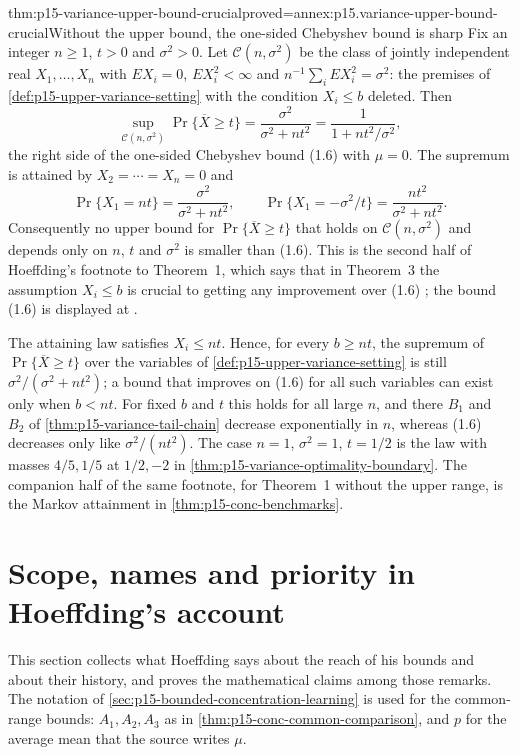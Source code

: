 \begin{hbtheorem}{thm:p15-variance-upper-bound-crucial}{proved=annex:p15.variance-upper-bound-crucial}{Without the upper bound, the one-sided Chebyshev bound is sharp}
Fix an integer \(n\geq1\), \(t>0\) and \(\sigma^2>0\). Let
\(\mathcal C(n,\sigma^2)\) be the class of jointly independent real
\(X_1,\ldots,X_n\) with \(EX_i=0\), \(EX_i^2<\infty\) and
\(n^{-1}\sum_iEX_i^2=\sigma^2\): the premises of
\cref{def:p15-upper-variance-setting} with the condition \(X_i\leq b\)
deleted. Then
\[
 \sup_{\mathcal C(n,\sigma^2)}\Pr\{\overline X\geq t\}
 =\frac{\sigma^2}{\sigma^2+nt^2}
 =\frac1{1+nt^2/\sigma^2},
\]
the right side of the one-sided Chebyshev bound (1.6) with \(\mu=0\).
The supremum is attained by \(X_2=\cdots=X_n=0\) and
\[
 \Pr\{X_1=nt\}=\frac{\sigma^2}{\sigma^2+nt^2},\qquad
 \Pr\{X_1=-\sigma^2/t\}=\frac{nt^2}{\sigma^2+nt^2}.
\]
Consequently no upper bound for \(\Pr\{\overline X\geq t\}\) that holds
on \(\mathcal C(n,\sigma^2)\) and depends only on \(n\), \(t\) and
\(\sigma^2\) is smaller than (1.6). This is the second half of
Hoeffding's footnote to Theorem~1, which says that in Theorem~3 the
assumption \(X_i\leq b\) is crucial to getting any improvement over
(1.6) \cite[p.~15 n.~4]{Hoeffding1963BoundedSums}; the bound (1.6) is
displayed at \cite[p.~13]{Hoeffding1963BoundedSums}.

The attaining law satisfies \(X_i\leq nt\). Hence, for every \(b\geq nt\),
the supremum of \(\Pr\{\overline X\geq t\}\) over the variables of
\cref{def:p15-upper-variance-setting} is still \(\sigma^2/(\sigma^2+nt^2)\);
a bound that improves on (1.6) for all such variables can exist only
when \(b<nt\). For fixed \(b\) and \(t\) this holds for all large \(n\),
and there \(B_1\) and \(B_2\) of \cref{thm:p15-variance-tail-chain}
decrease exponentially in \(n\), whereas (1.6) decreases only like
\(\sigma^2/(nt^2)\). The case \(n=1\), \(\sigma^2=1\), \(t=1/2\) is the
law with masses \(4/5,1/5\) at \(1/2,-2\) in
\cref{thm:p15-variance-optimality-boundary}.
The companion half of the same footnote, for Theorem~1 without the
upper range, is the Markov attainment in
\cref{thm:p15-conc-benchmarks}.
\end{hbtheorem}

\section{Scope, names and priority in Hoeffding's account}
\label{sec:p15-w02c-p15-017-hoeffding-scope}

This section collects what Hoeffding says about the reach of his bounds
and about their history, and proves the mathematical claims among those
remarks. The notation of \cref{sec:p15-bounded-concentration-learning}
is used for the common-range bounds: \(A_1,A_2,A_3\) as in
\cref{thm:p15-conc-common-comparison}, and \(p\) for the average mean
that the source writes \(\mu\).

